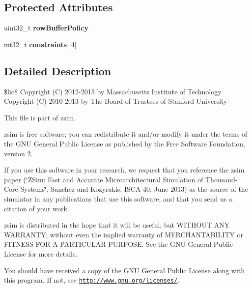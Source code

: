 \subsection*{Protected Attributes}
\begin{DoxyCompactItemize}
\item 
\hypertarget{classMemParam_a21aaca927f0ee13304d5895782a02ba1}{uint32\-\_\-t {\bfseries row\-Buffer\-Policy}}\label{classMemParam_a21aaca927f0ee13304d5895782a02ba1}

\item 
\hypertarget{classMemParam_afd945edccb22af0a4e40acfe4c0cda1e}{int32\-\_\-t {\bfseries constraints} \mbox{[}4\mbox{]}}\label{classMemParam_afd945edccb22af0a4e40acfe4c0cda1e}

\end{DoxyCompactItemize}


\subsection{Detailed Description}
\$lic\$ Copyright (C) 2012-\/2015 by Massachusetts Institute of Technology Copyright (C) 2010-\/2013 by The Board of Trustees of Stanford University

This file is part of zsim.

zsim is free software; you can redistribute it and/or modify it under the terms of the G\-N\-U General Public License as published by the Free Software Foundation, version 2.

If you use this software in your research, we request that you reference the zsim paper (\char`\"{}\-Z\-Sim\-: Fast and Accurate Microarchitectural Simulation of
\-Thousand-\/\-Core Systems\char`\"{}, Sanchez and Kozyrakis, I\-S\-C\-A-\/40, June 2013) as the source of the simulator in any publications that use this software, and that you send us a citation of your work.

zsim is distributed in the hope that it will be useful, but W\-I\-T\-H\-O\-U\-T A\-N\-Y W\-A\-R\-R\-A\-N\-T\-Y; without even the implied warranty of M\-E\-R\-C\-H\-A\-N\-T\-A\-B\-I\-L\-I\-T\-Y or F\-I\-T\-N\-E\-S\-S F\-O\-R A P\-A\-R\-T\-I\-C\-U\-L\-A\-R P\-U\-R\-P\-O\-S\-E. See the G\-N\-U General Public License for more details.

You should have received a copy of the G\-N\-U General Public License along with this program. If not, see \href{http://www.gnu.org/licenses/}{\tt http\-://www.\-gnu.\-org/licenses/}. 

